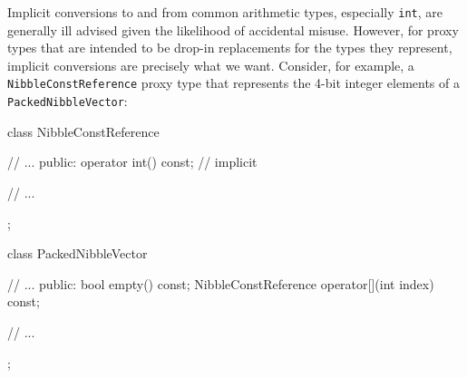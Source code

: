 Implicit conversions to and from common arithmetic types, especially
\lstinline!int!, are generally ill advised given the likelihood of
accidental misuse.
%
However, for proxy types that are intended to be drop-in replacements for the types they represent, implicit conversions are precisely what we want. Consider, for example, a \lstinline!NibbleConstReference!
 proxy type that represents the 4-bit integer elements of a \lstinline!PackedNibbleVector!:


\begin{emcppslisting}[emcppsbatch=e3]
class NibbleConstReference
{
    // ...
public:
    operator int() const; // implicit

    // ...
};

class PackedNibbleVector
{
    // ...
public:
    bool empty() const;
    NibbleConstReference operator[](int index) const;

    // ...
};
\end{emcppslisting}

